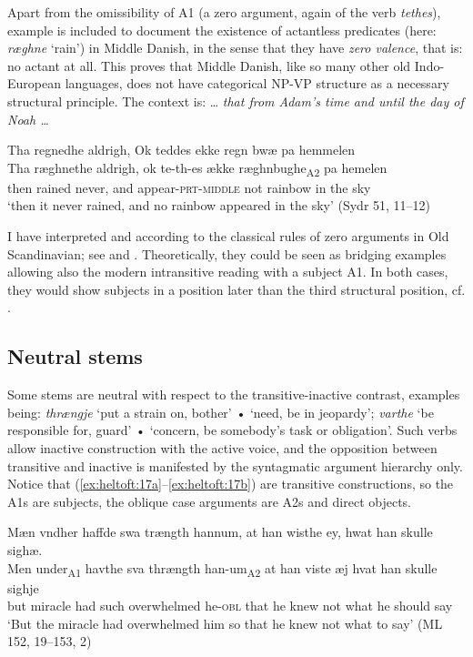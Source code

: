 \documentclass[output=paper]{langscibook}
\begin{document}
Apart from the omissibility of A1 (a zero argument, again of the verb \textit{tethes}), example  is included to document the existence of actantless predicates (here: \textit{ræghne} `rain') in Middle Danish, in the sense that they have \textit{zero valence}, that is: no actant at all. This proves that Middle Danish, like so many other old Indo-European languages, does not have categorical NP-VP structure as a necessary structural principle. The context is: … \textit{that from Adam's time and until the day of Noah …}

\begin{exe}
\ex \label{ex:heltoft:16}
    \glll Tha regnedhe aldrigh, Ok teddes ekke {regn bwæ} pa hemmelen\\
         Tha   ræghnethe    aldrigh, ok te-th-es ække  ræghnbughe\textsubscript{A2} pa hemelen\\
         then  rained never,  and appear-\textsc{prt-middle}   not    rainbow in {the sky}\\
    \glt `then it never rained, and no rainbow appeared in the sky' (Sydr 51, 11--12)
\end{exe}

I have interpreted  and  according to the classical rules of zero arguments in Old Scandinavian; see \citet{Heltoft2012} and \citet{Faarlund2004}. Theoretically, they could be seen as bridging examples allowing also  the modern intransitive reading with a subject A1. In both cases, they would show subjects in a position later than the third structural position, cf. . 

\subsection{Neutral stems} \label{heltoft:2.3}

Some stems are neutral with respect to the transitive-inactive contrast, examples being: \textit{thrængje} ‘put a strain on, bother' • ‘need, be in jeopardy'; \textit{varthe} ‘be responsible for, guard' • ‘concern, be somebody's task or obligation'. Such verbs allow inactive construction with the active voice, and the opposition between transitive and inactive is manifested by the syntagmatic argument hierarchy only. Notice that (\ref{ex:heltoft:17a}--\ref{ex:heltoft:17b}) are transitive constructions, so the A1s are subjects, the oblique case arguments are A2s and direct objects.

\ea \label{ex:heltoft:17} 
\ea \label{ex:heltoft:17a} 
    \glll Mæn vndher haffde swa trængth hannum, at han wisthe ey, hwat han skulle sighæ. \\
         Men   under\textsubscript{A1}  havthe sva   thrængth       han-um\textsubscript{A2}   at han viste æj hvat han skulle sighje\\
         but   miracle  had   such  overwhelmed    he-\textsc{obl}    that he knew not what he should say\\
    \glt `But the miracle had overwhelmed him so that he knew not what to say' (ML 152, 19--153, 2)
\end{document}
